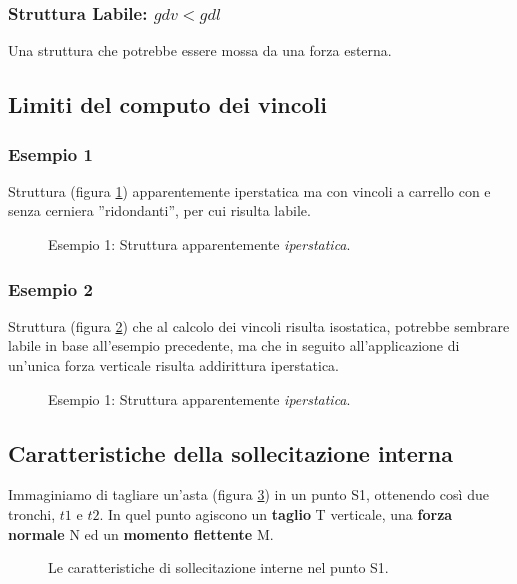 \documentclass[main.tex]{subfiles}
\begin{document}
\subsubsection{Struttura Labile: $gdv < gdl$}
Una struttura che potrebbe essere mossa da una forza esterna.

\subsection{Limiti del computo dei vincoli}

\subsubsection{Esempio 1}
Struttura (figura \ref{es1}) apparentemente iperstatica ma con vincoli a carrello con e senza cerniera ”ridondanti”, per cui risulta labile.

\begin{figure}[H]
  \centering
  \resizebox{0.75\textwidth}{!}{}
  \caption{Esempio 1: Struttura apparentemente \textit{iperstatica}.}
  \label{es1}
\end{figure}

\subsubsection{Esempio 2}
Struttura (figura \ref{es2}) che al calcolo dei vincoli risulta isostatica, potrebbe sembrare labile in base all’esempio precedente, ma che in seguito all’applicazione di un’unica forza verticale risulta addirittura iperstatica.

\begin{figure}[H]
  \centering
  \resizebox{0.75\textwidth}{!}{}
  \caption{ Esempio 1: Struttura apparentemente \textit{iperstatica}.}
  \label{es2}
\end{figure}

\subsection{Caratteristiche della sollecitazione interna}
Immaginiamo di tagliare un’asta (figura \ref{sollecitazione_interne}) in un punto S1, ottenendo così due tronchi, $t1$ e $t2$. In quel punto agiscono un \textbf{taglio} T verticale, una \textbf{forza normale} N ed un \textbf{momento flettente} M.

\begin{figure}[H]
  \centering
  \resizebox{0.75\textwidth}{!}{}
  \caption{Le caratteristiche di sollecitazione interne nel punto S1.}
  \label{sollecitazione_interne}
\end{figure}
\end{document}
